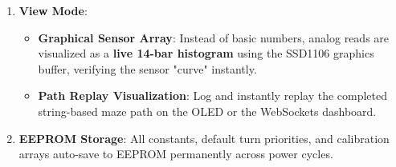 \documentclass[12pt,a4paper]{article}
\begin{document}
\begin{enumerate}
\begin{itemize}
        \item \textbf{Default Turn Priority}: Configure the default dead-end / split-path behavior for Speed Runs or Explorer rules ("L/R/S").
        \item \textbf{Servo Calibration}: Features explicit menu options to set and store the neutral, min, and max positions of the payload Lift and Grab servos.
        \item \textbf{Network / Modems}: Manually enable/disable Wi-Fi and Bluetooth. \textit{(Note: Any parameter or function toggle located in multiple menus acts uniformly. Toggling Wi-Fi here completely syncs the robot state universally, applying equally to the Debug Web-Dashboard and blocking constraints).}
        \item Use Rotary Encoder to edit \lstinline|Kp|, \lstinline|Ki|, \lstinline|Kd|, Component Pinouts, and Motor Speeds.
    \end{itemize}
    \item \textbf{View Mode}: 
    \begin{itemize}
        \item \textbf{Graphical Sensor Array}: Instead of basic numbers, analog reads are visualized as a \textbf{live 14-bar histogram} using the SSD1106 graphics buffer, verifying the sensor "curve" instantly.
        \item \textbf{Path Replay Visualization}: Log and instantly replay the completed string-based maze path on the OLED or the WebSockets dashboard.
    \end{itemize}
    \item \textbf{EEPROM Storage}: All constants, default turn priorities, and calibration arrays auto-save to EEPROM permanently across power cycles.
\end{enumerate}
\end{document}
